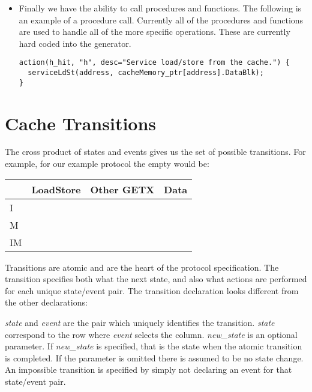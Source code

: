 \documentclass[11pt]{article}
\begin{document}
\begin{itemize}
\item
Finally we have the ability to call procedures and functions.  The
following is an example of a procedure call.  Currently all of the
procedures and functions are used to handle all of the more specific
operations.  These are currently hard coded into the generator.

\begin{verbatim}
action(h_hit, "h", desc="Service load/store from the cache.") {
  serviceLdSt(address, cacheMemory_ptr[address].DataBlk);
}
\end{verbatim}

\end{itemize}

\section*{Cache Transitions}

The cross product of states and events gives us the set of possible
transitions.  For example, for our example protocol the empty would
be:

\begin{center}
\begin{tabular}{|l||l|l|l|} \hline
   & LoadStore & Other GETX & Data \\ \hline  \hline
I  & & &  \\ \hline
M  & & &  \\ \hline
IM & & & \\ \hline
\end{tabular}
\end{center}


Transitions are atomic and are the heart of the protocol
specification.  The transition specifies both what the next state, and
also what actions are performed for each unique state/event pair.  The
transition declaration looks different from the other declarations:


{\em state} and {\em event} are the pair which uniquely identifies the
transition. {\em state} correspond to the row where {\em event}
selects the column.  {\em new\_state} is an optional parameter.  If
{\em new\_state} is specified, that is the state when the atomic
transition is completed.  If the parameter is omitted there is assumed
to be no state change.  An impossible transition is specified by
simply not declaring an event for that state/event pair.
\end{document}
